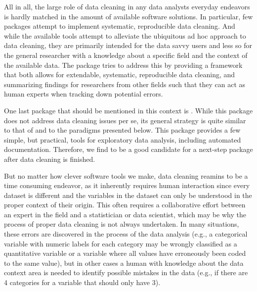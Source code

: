 \documentclass[article,shortnames]{jss}
\begin{document}
All in all, the large role of data cleaning in any data analysts everyday endeavors is 
hardly matched in the amount of available  software solutions. In particular,
few packages attempt to implement systematic, reproducible data cleaning. And 
while the available tools attempt to alleviate the ubiquitous ad hoc approach
to data cleaning, they are primarily intended for the data savvy users
and less so for the general researcher with a knowledge about a specific
field and the context of the available data. The 
package \citep{dataMaid} tries to address this by providing a framework that both allows for
extendable, systematic, reproducible data cleaning, and summarizing
findings for researchers from other fields such that they can act as
human experts when tracking down potential errors.

One last package that should be mentioned in this context is . While this
package does not address data cleaning issues per se, its general strategy is quite similar
to that of  and to the paradigms presented below. This package provides 
a few simple, but practical, tools for exploratory data analysis, including automated 
documentation. Therefore, we find  to be a good candidate for a next-step
package after data cleaning is finished. 
  
But no matter how clever software tools we make, data cleaning 
reamins to be a time consuming endeavor, as it inherently requires
human interaction since every dataset is different and the variables
in the dataset can only be understood in the proper context of their
origin. This often requires a collaborative effort between an expert
in the field and a statistician or data scientist, which may be why
the process of proper data cleaning is not always undertaken. In many
situations, these errors are discovered in the process of the data
analysis (e.g., a categorical variable with numeric labels for each
category may be wrongly classified as a quantitative variable or a
variable where all values have erroneously been coded to the same
value), but in other cases a human with knowledge about the data
context area is needed to identify possible mistakes in the data
(e.g., if there are 4 categories for a variable that should only have
3).
\end{document}
